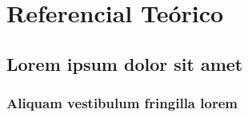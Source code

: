 \part{Referencial Teórico}

\chapter{Lorem ipsum dolor sit amet}

\section{Aliquam vestibulum fringilla lorem}

\lipsum[1]

\lipsum[2-3]